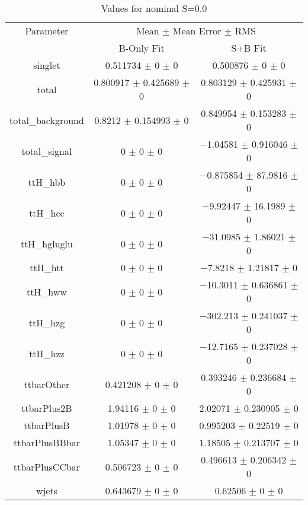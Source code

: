 \begin{table}
\centering
\caption{Values for nominal S=0.0}
\begin{tabular}{ccc}
\toprule
Parameter & \multicolumn{2}{c}{Mean $\pm$ Mean Error $\pm$ RMS}\\
 & B-Only Fit & S+B Fit\\
\midrule
singlet & \num{0.511734} $\pm$ \num{0} $\pm$ \num{0} & \num{0.500876} $\pm$ \num{0} $\pm$ \num{0}\\
total & \num{0.800917} $\pm$ \num{0.425689} $\pm$ \num{0} & \num{0.803129} $\pm$ \num{0.425931} $\pm$ \num{0}\\
total\_background & \num{0.8212} $\pm$ \num{0.154993} $\pm$ \num{0} & \num{0.849954} $\pm$ \num{0.153283} $\pm$ \num{0}\\
total\_signal & \num{0} $\pm$ \num{0} $\pm$ \num{0} & \num{-1.04581} $\pm$ \num{0.916046} $\pm$ \num{0}\\
ttH\_hbb & \num{0} $\pm$ \num{0} $\pm$ \num{0} & \num{-0.875854} $\pm$ \num{87.9816} $\pm$ \num{0}\\
ttH\_hcc & \num{0} $\pm$ \num{0} $\pm$ \num{0} & \num{-9.92447} $\pm$ \num{16.1989} $\pm$ \num{0}\\
ttH\_hgluglu & \num{0} $\pm$ \num{0} $\pm$ \num{0} & \num{-31.0985} $\pm$ \num{1.86021} $\pm$ \num{0}\\
ttH\_htt & \num{0} $\pm$ \num{0} $\pm$ \num{0} & \num{-7.8218} $\pm$ \num{1.21817} $\pm$ \num{0}\\
ttH\_hww & \num{0} $\pm$ \num{0} $\pm$ \num{0} & \num{-10.3011} $\pm$ \num{0.636861} $\pm$ \num{0}\\
ttH\_hzg & \num{0} $\pm$ \num{0} $\pm$ \num{0} & \num{-302.213} $\pm$ \num{0.241037} $\pm$ \num{0}\\
ttH\_hzz & \num{0} $\pm$ \num{0} $\pm$ \num{0} & \num{-12.7165} $\pm$ \num{0.237028} $\pm$ \num{0}\\
ttbarOther & \num{0.421208} $\pm$ \num{0} $\pm$ \num{0} & \num{0.393246} $\pm$ \num{0.236684} $\pm$ \num{0}\\
ttbarPlus2B & \num{1.94116} $\pm$ \num{0} $\pm$ \num{0} & \num{2.02071} $\pm$ \num{0.230905} $\pm$ \num{0}\\
ttbarPlusB & \num{1.01978} $\pm$ \num{0} $\pm$ \num{0} & \num{0.995203} $\pm$ \num{0.22519} $\pm$ \num{0}\\
ttbarPlusBBbar & \num{1.05347} $\pm$ \num{0} $\pm$ \num{0} & \num{1.18505} $\pm$ \num{0.213707} $\pm$ \num{0}\\
ttbarPlusCCbar & \num{0.506723} $\pm$ \num{0} $\pm$ \num{0} & \num{0.496613} $\pm$ \num{0.206342} $\pm$ \num{0}\\
wjets & \num{0.643679} $\pm$ \num{0} $\pm$ \num{0} & \num{0.62506} $\pm$ \num{0} $\pm$ \num{0}\\
\bottomrule
\end{tabular}
\end{table}